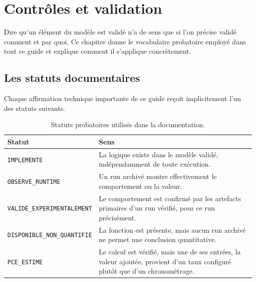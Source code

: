\chapter{Contrôles et validation}
\label{chap:controles-validation}

Dire qu'un élément du modèle est validé n'a de sens que si l'on précise validé comment et par quoi. Ce chapitre donne le vocabulaire probatoire employé dans tout ce guide et explique comment il s'applique concrètement.

\section{Les statuts documentaires}

Chaque affirmation technique importante de ce guide reçoit implicitement l'un des statuts suivants.

\begin{table}[H]
  \centering
  \small
  \begin{tabularx}{\textwidth}{L{0.27\textwidth} Y}
    \toprule
    Statut & Sens \\
    \midrule
    \texttt{IMPLEMENTE} & La logique existe dans le modèle validé, indépendamment de toute exécution. \\
    \texttt{OBSERVE\_\hspace{0pt}RUNTIME} & Un run archivé montre effectivement le comportement ou la valeur. \\
    \texttt{VALIDE\_\hspace{0pt}EXPERIMENTALEMENT} & Le comportement est confirmé par les artefacts primaires d'un run vérifié, pour ce run précisément. \\
    \texttt{DISPONIBLE\_\hspace{0pt}NON\_\hspace{0pt}QUANTIFIE} & La fonction est présente, mais aucun run archivé ne permet une conclusion quantitative. \\
    \texttt{PCE\_ESTIME} & Le calcul est vérifié, mais une de ses entrées, la valeur ajoutée, provient d'un taux configuré plutôt que d'un chronométrage. \\
    \bottomrule
  \end{tabularx}
  \caption{Statuts probatoires utilisés dans la documentation.}
  \label{tab:statuts-probatoires}
\end{table}


